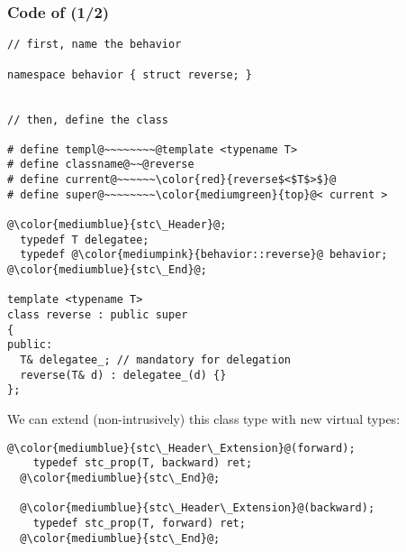 \begin{frame}[fragile]
  \frametitle{Code of \bfreverseT (1/2)}

\begin{multicols}{2}
%
\begin{lstlisting}[escapechar=@,basicstyle={\tiny\sffamily}]
// first, name the behavior

namespace behavior { struct reverse; }


// then, define the class

# define templ@~~~~~~~~@template <typename T>
# define classname@~~@reverse
# define current@~~~~~~\color{red}{reverse$<$T$>$}@
# define super@~~~~~~~~\color{mediumgreen}{top}@< current >

@\color{mediumblue}{stc\_Header}@;
  typedef T delegatee;
  typedef @\color{mediumpink}{behavior::reverse}@ behavior;
@\color{mediumblue}{stc\_End}@;

template <typename T>
class reverse : public super
{
public:
  T& delegatee_; // mandatory for delegation
  reverse(T& d) : delegatee_(d) {}
};
\end{lstlisting}
%
\columnbreak
%
{\scriptsize{ We can extend (non-intrusively) this class type with
    new virtual types: }} \smallskip

\begin{lstlisting}[escapechar=@,basicstyle={\tiny\sffamily}]
  @\color{mediumblue}{stc\_Header\_Extension}@(forward);
    typedef stc_prop(T, backward) ret;
  @\color{mediumblue}{stc\_End}@;

  @\color{mediumblue}{stc\_Header\_Extension}@(backward);
    typedef stc_prop(T, forward) ret;
  @\color{mediumblue}{stc\_End}@;
\end{lstlisting}

%
\end{multicols}

\end{frame}



